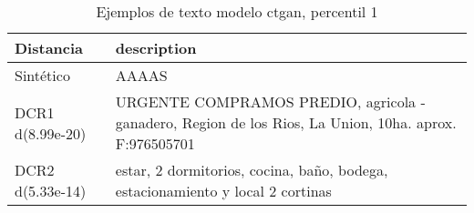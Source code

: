 \begin{table}[H]
\centering
\fontsize{10}{14}\selectfont
\caption{Ejemplos de texto modelo ctgan, percentil 1}
\label{table-example-economicos-b-1-ctgan-1p-text}
\begin{tabular}{|l|m{35em}|}
\hline
\rowcolor[gray]{0.8}
Distancia & description \\
\hline Sintético & AAAAS \\
\hline DCR1 d(8.99e-20) & URGENTE COMPRAMOS PREDIO, agricola - ganadero, Region de los Rios, La Union, 10ha. aprox. F:976505701 \\
\hline DCR2 d(5.33e-14) & estar, 2 dormitorios, cocina, ba\~no, bodega, estacionamiento y local 2 cortinas \\
\hline
\end{tabular}
\end{table}
